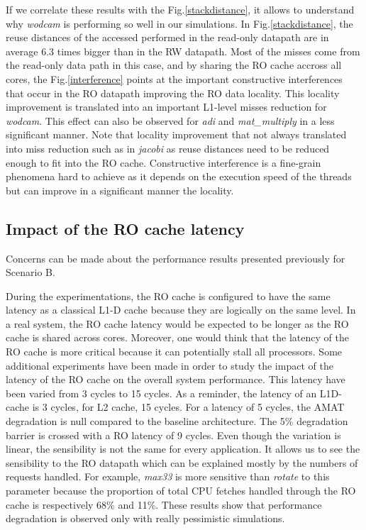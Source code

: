 \documentclass[sigconf]{acmart}
\begin{document}
If we correlate these results with the Fig.\ref{stackdistance}, it allows to understand why \textit{wodcam} is performing so well in our simulations. In Fig.\ref{stackdistance}, the reuse distances of the accessed performed in the read-only datapath are in average 6.3 times bigger than in the RW datapath. Most of the misses come from the read-only data path in this case, and by sharing the RO cache accross all cores, the Fig.\ref{interference} points at the important constructive interferences that occur in the RO datapath improving the RO data locality. This locality improvement is translated into an important L1-level misses reduction for \textit{wodcam}. This effect can also be observed for \textit{adi} and \textit{mat\_multiply} in a less significant manner. Note that locality improvement that not always translated into miss reduction such as in \textit{jacobi} as reuse distances need to be reduced enough to fit into the RO cache. 
Constructive interference is a fine-grain phenomena hard to achieve as it depends on the execution speed of the threads but can improve in a significant manner the locality. 


\subsection{Impact of the RO cache latency}

Concerns can be made about the performance results presented
previously for Scenario B.

 During the experimentations, the RO cache
is configured to have the same latency as a classical L1-D cache
because they are logically on the same level. In a real system, the RO cache latency would be expected to be longer as the RO cache is shared across cores. Moreover, one would think that the latency of the RO cache is more critical because it can potentially stall all processors. Some additional experiments have been made in order to study the impact of the latency of the RO cache on the overall system performance. This latency have been varied from 3 cycles to 15 cycles. As a reminder, the latency of an L1D-cache is 3 cycles, for L2 cache, 15 cycles. For a latency of 5 cycles, the AMAT degradation is null compared to the baseline architecture. The 5\% degradation barrier is crossed with a RO latency of 9 cycles. Even though the variation is linear, the sensibility is not the same for every application. It allows us to see the sensibility to the RO datapath which can be explained mostly by the numbers of requests handled. For example, \textit{max33} is more sensitive than \textit{rotate} to this parameter because the proportion of total CPU fetches handled through the RO cache is respectively 68\% and 11\%. These results show that performance degradation is observed only with really pessimistic simulations.
\end{document}
